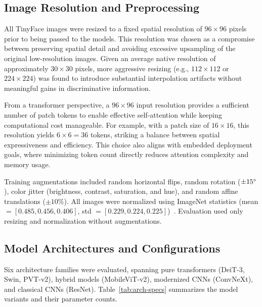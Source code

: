 \documentclass[runningheads,a4paper]{llncs}
\begin{document}
\subsection{Image Resolution and Preprocessing}
All TinyFace images were resized to a fixed spatial resolution of $96\times96$ pixels prior to being passed to the models. This resolution was chosen as a compromise between preserving spatial detail and avoiding excessive upsampling of the original low-resolution images. Given an average native resolution of approximately $30\times30$ pixels, more aggressive resizing (e.g., $112\times112$ or $224\times224$) was found to introduce substantial interpolation artifacts without meaningful gains in discriminative information.

From a transformer perspective, a $96\times96$ input resolution provides a sufficient number of patch tokens to enable effective self-attention while keeping computational cost manageable. For example, with a patch size of $16\times16$, this resolution yields $6\times6=36$ tokens, striking a balance between spatial expressiveness and efficiency. This choice also aligns with embedded deployment goals, where minimizing token count directly reduces attention complexity and memory usage.

Training augmentations included random horizontal flips, random rotation ($\pm 15\degree$), color jitter (brightness, contrast, saturation, and hue), and random affine translations ($\pm 10\%$). All images were normalized using ImageNet statistics (mean $=[0.485, 0.456, 0.406]$, std $=[0.229, 0.224, 0.225]$)~\cite{russakovsky2015imagenet}. Evaluation used only resizing and normalization without augmentations.

\subsection{Model Architectures and Configurations}
Six architecture families were evaluated, spanning pure transformers (DeiT-3, Swin, PVT-v2), hybrid models (MobileViT-v2), modernized CNNs (ConvNeXt), and classical CNNs (ResNet). Table~\ref{tab:arch-specs} summarizes the model variants and their parameter counts.
\end{document}
